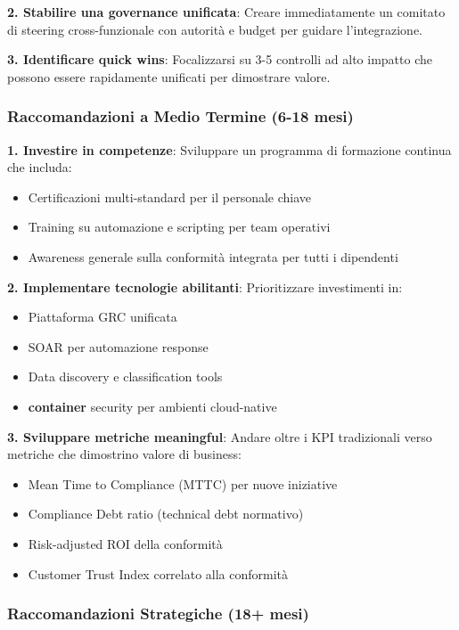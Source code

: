 \textbf{2. Stabilire una governance unificata}:
Creare immediatamente un comitato di steering cross-funzionale con autorità e budget per guidare l'integrazione.

\textbf{3. Identificare quick wins}:
Focalizzarsi su 3-5 controlli ad alto impatto che possono essere rapidamente unificati per dimostrare valore.

\subsubsection{\texorpdfstring{Raccomandazioni a Medio Termine (6-18 mesi)}{4.9.3.2 - Raccomandazioni a Medio Termine (6-18 mesi)}}

\textbf{1. Investire in competenze}:
Sviluppare un programma di formazione continua che includa:
\begin{itemize}
    \item Certificazioni multi-standard per il personale chiave
    \item Training su automazione e scripting per team operativi
    \item Awareness generale sulla conformità integrata per tutti i dipendenti
\end{itemize}

\textbf{2. Implementare tecnologie abilitanti}:
Prioritizzare investimenti in:
\begin{itemize}
    \item Piattaforma GRC unificata
    \item SOAR per automazione response
    \item Data discovery e classification tools
    \item \textbf{\gls{container}} security per ambienti cloud-native
\end{itemize}

\textbf{3. Sviluppare metriche meaningful}:
Andare oltre i KPI tradizionali verso metriche che dimostrino valore di business:
\begin{itemize}
    \item Mean Time to Compliance (MTTC) per nuove iniziative
    \item Compliance Debt ratio (technical debt normativo)
    \item Risk-adjusted ROI della conformità
    \item Customer Trust Index correlato alla conformità
\end{itemize}

\subsubsection{\texorpdfstring{Raccomandazioni Strategiche (18+ mesi)}{4.9.3.3 - Raccomandazioni Strategiche (18+ mesi)}}

